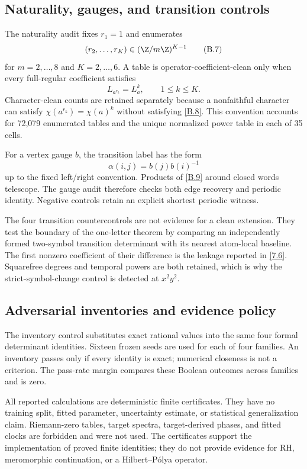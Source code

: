 \subsection{Naturality, gauges, and transition controls}

The naturality audit fixes \(r_1=1\) and enumerates
\[
(r_2,\ldots,r_K)\in(\Z/m\Z)^{K-1}
\tag{B.7}\label{B.7}
\]
for \(m=2,\ldots,8\) and \(K=2,\ldots,6\).  A table is
operator-coefficient-clean only when every full-regular coefficient satisfies
\[
L_{a^{r_k}}=L_a^k,\qquad 1\le k\le K.
\tag{B.8}\label{B.8}
\]
Character-clean counts are retained separately because a nonfaithful
character can satisfy \(\chi(a^{r_k})=\chi(a)^k\) without satisfying
\eqref{B.8}.  This convention accounts for 72,079 enumerated tables and the
unique normalized power table in each of 35 cells.

For a vertex gauge \(b\), the transition label has the form
\[
\alpha(i,j)=b(j)b(i)^{-1}
\tag{B.9}\label{B.9}
\]
up to the fixed left/right convention.  Products of \eqref{B.9} around closed
words telescope.  The gauge audit therefore checks both edge recovery and
periodic identity.  Negative controls retain an explicit shortest periodic
witness.

The four transition countercontrols are not evidence for a clean extension.
They test the boundary of the one-letter theorem by comparing an independently
formed two-symbol transition determinant with its nearest atom-local baseline.
The first nonzero coefficient of their difference is the leakage reported in
\eqref{7.6}.  Squarefree degrees and temporal powers are both retained, which
is why the strict-symbol-change control is detected at \(x^2y^2\).

\subsection{Adversarial inventories and evidence policy}

The inventory control substitutes exact rational values into the same four
formal determinant identities.  Sixteen frozen seeds are used for each of
four families.  An inventory passes only if every identity is exact; numerical
closeness is not a criterion.  The pass-rate margin compares these Boolean
outcomes across families and is zero.

All reported calculations are deterministic finite certificates.  They have
no training split, fitted parameter, uncertainty estimate, or statistical
generalization claim.  Riemann-zero tables, target spectra, target-derived
phases, and fitted clocks are forbidden and were not used.  The certificates
support the implementation of proved finite identities; they do not provide
evidence for RH, meromorphic continuation, or a Hilbert--Pólya operator.
